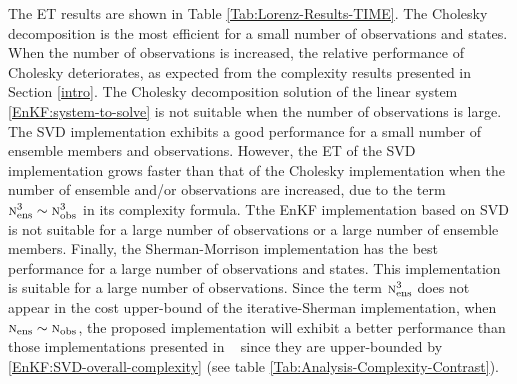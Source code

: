 \documentclass[12pt]{article}
\newcommand{\Nobs}{\textsc{n}_{{\rm obs}}}
\newcommand{\Nens}{\textsc{n}_{{\rm ens}}}
\begin{document}
The ET results are shown in Table  \ref{Tab:Lorenz-Results-TIME}.
The Cholesky decomposition is the most efficient for a small number of observations and states. 
When the number of observations is increased, the relative performance of Cholesky deteriorates, as expected from the complexity results presented in Section  \ref{intro}. The Cholesky decomposition solution of the linear system \eqref{EnKF:system-to-solve} is not suitable when the number of observations is large. The SVD implementation exhibits a good performance for a small number of ensemble members and observations. However, the ET of the SVD implementation grows faster than that of the Cholesky implementation when the number of ensemble and/or observations are increased, due to the term $\Nens^3 \sim \Nobs^3$ in its complexity formula. Tthe EnKF implementation based on SVD is not suitable  for a large  number of observations or a large number of ensemble members. Finally, the Sherman-Morrison implementation has the best performance for a large number of observations and states. This implementation is suitable for a large number of observations. Since the term $\Nens^3$ does not appear in the cost upper-bound of the iterative-Sherman implementation, when $\Nens \sim \Nobs$, the proposed implementation will exhibit a better performance than those implementations presented in ~\cite{Anderson01,Anderson07,Tippett2003} since they are upper-bounded by  \eqref{EnKF:SVD-overall-complexity} (see table  \ref{Tab:Analysis-Complexity-Contrast}). 
\end{document}
